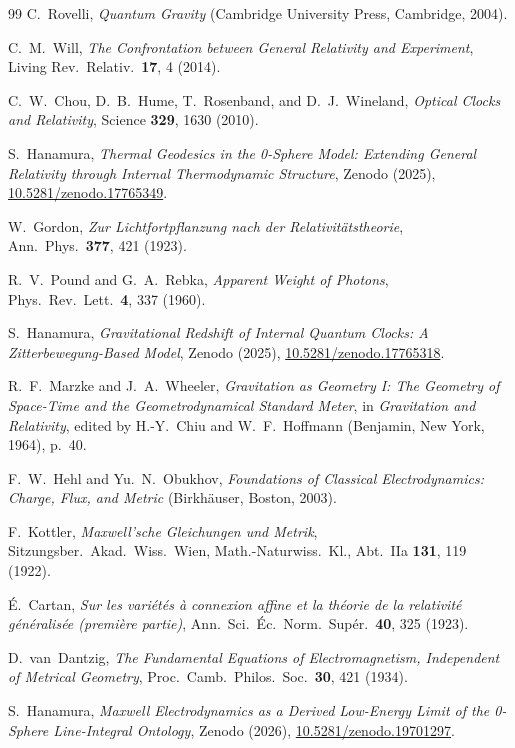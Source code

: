 \documentclass[%
 reprint, amsmath,amssymb, aps, prb, ]{revtex4-2}
\numberwithin{equation}{section}
\begin{document}
\begin{thebibliography}{99}
C.~Rovelli,
\emph{Quantum Gravity}
(Cambridge University Press, Cambridge, 2004).

C.~M.~Will,
\emph{The Confrontation between General Relativity and Experiment},
Living Rev.~Relativ.\ \textbf{17}, 4 (2014).

C.~W.~Chou, D.~B.~Hume, T.~Rosenband, and D.~J.~Wineland,
\emph{Optical Clocks and Relativity},
Science \textbf{329}, 1630 (2010).

S.~Hanamura,
\emph{Thermal Geodesics in the 0-Sphere Model: Extending General Relativity through Internal Thermodynamic Structure},
Zenodo (2025), \href{https://doi.org/10.5281/zenodo.17765349}{10.5281/zenodo.17765349}.

W.~Gordon,
\emph{Zur Lichtfortpflanzung nach der Relativit\"atstheorie},
Ann.~Phys.\ \textbf{377}, 421 (1923).

R.~V.~Pound and G.~A.~Rebka,
\emph{Apparent Weight of Photons},
Phys.~Rev.~Lett.\ \textbf{4}, 337 (1960).

S.~Hanamura,
\emph{Gravitational Redshift of Internal Quantum Clocks: A Zitterbewegung-Based Model},
Zenodo (2025), \href{https://doi.org/10.5281/zenodo.17765318}{10.5281/zenodo.17765318}.

R.~F.~Marzke and J.~A.~Wheeler,
\emph{Gravitation as Geometry I: The Geometry of Space-Time and the Geometrodynamical Standard Meter},
in \emph{Gravitation and Relativity}, edited by H.-Y.~Chiu and W.~F.~Hoffmann (Benjamin, New York, 1964), p.~40.

F.~W.~Hehl and Yu.~N.~Obukhov,
\emph{Foundations of Classical Electrodynamics: Charge, Flux, and Metric}
(Birkh\"auser, Boston, 2003).

F.~Kottler,
\emph{Maxwell'sche Gleichungen und Metrik},
Sitzungsber.~Akad.~Wiss.~Wien, Math.-Naturwiss.~Kl., Abt.~IIa \textbf{131}, 119 (1922).

\'E.~Cartan,
\emph{Sur les vari\'et\'es \`a connexion affine et la th\'eorie de la relativit\'e g\'en\'eralis\'ee (premi\`ere partie)},
Ann.~Sci.~\'Ec.~Norm.~Sup\'er.\ \textbf{40}, 325 (1923).

D.~van~Dantzig,
\emph{The Fundamental Equations of Electromagnetism, Independent of Metrical Geometry},
Proc.~Camb.~Philos.~Soc.\ \textbf{30}, 421 (1934).

S.~Hanamura,
\emph{Maxwell Electrodynamics as a Derived Low-Energy Limit of the 0-Sphere Line-Integral Ontology},
Zenodo (2026), \href{https://doi.org/10.5281/zenodo.19701297}{10.5281/zenodo.19701297}.


\end{thebibliography}
\end{document}
